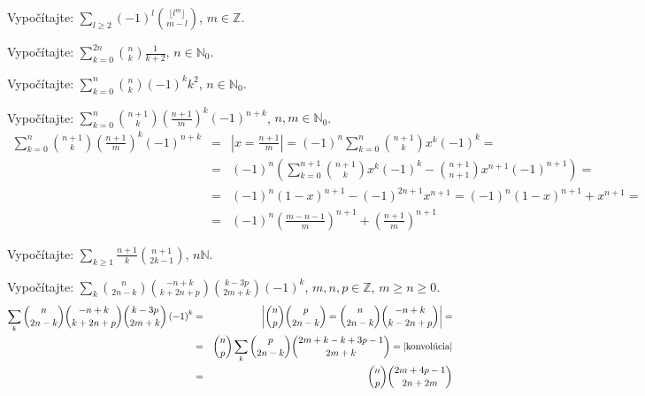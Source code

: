 \pr Vypočítajte: $\sum_{l\geq 2}\left(-1\right)^l{\lfloor l^m \rfloor \choose m-l}$, $m\in\mathbb{Z}$.

\pr Vypočítajte: $\sum_{k=0}^{2n}{n \choose k}\frac1{k+2}$, $n\in\mathbb{N}_0$.

\pr Vypočítajte: $\sum_{k=0}^{n}{n \choose k}\left(-1\right)^k k^2$, $n\in\mathbb{N}_0$.

\pr Vypočítajte: $\sum_{k=0}^{n}{n+1 \choose k}\left(\frac{n+1}m\right)^k \left(-1\right)^{n+k}$, $n,m\in\mathbb{N}_0$.
\begin{eqnarray*}
\sum_{k=0}^{n}{n+1 \choose k}\left(\frac{n+1}m\right)^k \left(-1\right)^{n+k} &=& \left| x = \frac{n+1}m \right| = \left(-1\right)^n\sum_{k=0}^n{n+1 \choose k}x^k\left(-1\right)^k =\\
&=& \left(-1\right)^n\left(\sum_{k=0}^{n+1}{n+1 \choose k}x^k\left(-1\right)^k - {n+1 \choose n+1}x^{n+1}\left(-1\right)^{n+1}\right) = \\
&=& \left(-1\right)^n\left(1-x\right)^{n+1} - \left(-1\right)^{2n+1}x^{n+1} = \left(-1\right)^n\left(1-x\right)^{n+1}+x^{n+1} = \\
&=& \left(-1\right)^n\left(\frac{m-n-1}m\right)^{n+1}+\left(\frac{n+1}m\right)^{n+1}
\end{eqnarray*}

\pr Vypočítajte: $\sum_{k\geq1}\frac{n+1}k{n+1 \choose 2k-1}$, $n\mathbb{N}$.

\pr Vypočítajte: $\sum_k{n \choose 2n-k}{-n+k \choose k+2n+p}{k-3p \choose 2m+k}\left(-1\right)^k$, $m,n,p\in\mathbb{Z}$, $m\geq n\geq 0$.
\begin{eqnarray*}
\sum_k{n \choose 2n-k}{-n+k \choose k+2n+p}{k-3p \choose 2m+k}\left(-1\right)^k &=& \left| {n \choose p}{p \choose 2n-k} = {n \choose 2n-k}{-n+k \choose k-2n+p}\right| = \\
&=& {n \choose p}\sum_k{p \choose 2n-k}{2m+k-k+3p-1 \choose 2m+k} = |\hbox{konvolúcia}|\\
&=& {n \choose p}{2m+4p-1 \choose 2n+2m}
\end{eqnarray*}

